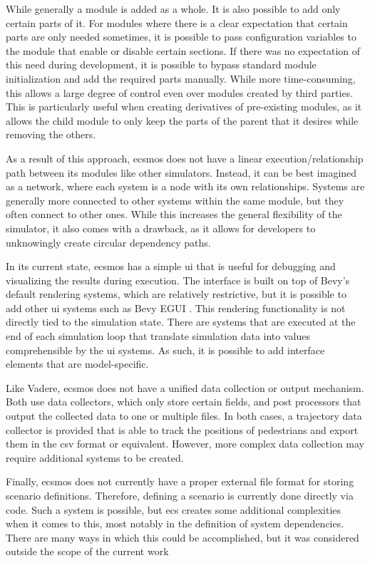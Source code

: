 \documentclass[twoside, 11pt]{article}
\begin{document}
While generally a module is added as a whole. It is also possible to add only certain parts of it. For modules where there is a clear expectation that certain parts are only needed sometimes, it is possible to pass configuration variables to the module that enable or disable certain sections. If there was no expectation of this need during development, it is possible to bypass standard module initialization and add the required parts manually. While more time-consuming, this allows a large degree of control even over modules created by third parties. This is particularly useful when creating derivatives of pre-existing modules, as it allows the child module to only keep the parts of the parent that it desires while removing the others.

As a result of this approach, \gls{ecsmos} does not have a linear execution/relationship path between its modules like other simulators. Instead, it can be best imagined as a network, where each system is a node with its own relationships. Systems are generally more connected to other systems within the same module, but they often connect to other ones. While this increases the general flexibility of the simulator, it also comes with a drawback, as it allows for developers to unknowingly create circular dependency paths.

In its current state, \gls{ecsmos} has a simple \gls{ui} that is useful for debugging and visualizing the results during execution. The interface is built on top of Bevy's default rendering systems, which are relatively restrictive, but it is possible to add other \gls{ui} systems such as Bevy EGUI \cite{bevyegui}. This rendering functionality is not directly tied to the simulation state. There are systems that are executed at the end of each simulation loop that translate simulation data into values comprehensible by the \gls{ui} systems. As such, it is possible to add interface elements that are model-specific. 

Like Vadere, \gls{ecsmos} does not have a unified data collection or output mechanism. Both use data collectors, which only store certain fields, and post processors that output the collected data to one or multiple files. In both cases, a trajectory data collector is provided that is able to track the positions of pedestrians and export them in the \gls{csv} format or equivalent. However, more complex data collection may require additional systems to be created.

Finally, \gls{ecsmos} does not currently have a proper external file format for storing scenario definitions. Therefore, defining a scenario is currently done directly via code. Such a system is possible, but \gls{ecs} creates some additional complexities when it comes to this, most notably in the definition of system dependencies. There are many ways in which this could be accomplished, but it was considered outside the scope of the current work
\end{document}
